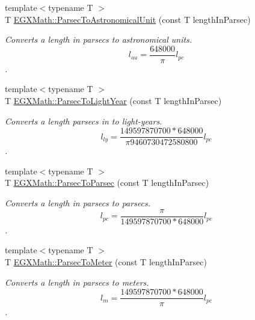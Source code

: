 \begin{DoxyCompactItemize}
\item 
{\footnotesize template$<$typename T $>$ }\\T \mbox{\hyperlink{group___e_g_x_math-_conversions-_length_conversions-_astronomical-_parsec-_astronomical_ga635dd871156c8bdd5e27198ba323380c}{E\+G\+X\+Math\+::\+Parsec\+To\+Astronomical\+Unit}} (const T length\+In\+Parsec)
\begin{DoxyCompactList}\small\item\em Converts a length in parsecs to astronomical units. \[ l_{au}= \frac{648000}{\pi} l_{pc} \]. \end{DoxyCompactList}\item 
{\footnotesize template$<$typename T $>$ }\\T \mbox{\hyperlink{group___e_g_x_math-_conversions-_length_conversions-_astronomical-_parsec-_astronomical_gaf6681b9c24d89c83c48bf6dabb9a433d}{E\+G\+X\+Math\+::\+Parsec\+To\+Light\+Year}} (const T length\+In\+Parsec)
\begin{DoxyCompactList}\small\item\em Converts a length parsecs in to light-\/years. \[ l_{ly}= \frac{149597870700 * 648000}{\pi 9460730472580800} l_{pc} \]. \end{DoxyCompactList}\item 
{\footnotesize template$<$typename T $>$ }\\T \mbox{\hyperlink{group___e_g_x_math-_conversions-_length_conversions-_astronomical-_parsec-_astronomical_gaf26b93b0097631545621d26c5a1366fc}{E\+G\+X\+Math\+::\+Parsec\+To\+Parsec}} (const T length\+In\+Parsec)
\begin{DoxyCompactList}\small\item\em Converts a length in parsecs to parsecs. \[ l_{pc}=\frac{\pi}{149597870700 * 648000} l_{pc} \]. \end{DoxyCompactList}\item 
{\footnotesize template$<$typename T $>$ }\\T \mbox{\hyperlink{group___e_g_x_math-_conversions-_length_conversions-_astronomical-_parsec-_s_i_gaa97ff0501ce04074bf9aacafc2135532}{E\+G\+X\+Math\+::\+Parsec\+To\+Meter}} (const T length\+In\+Parsec)
\begin{DoxyCompactList}\small\item\em Converts a length in parsecs to meters. \[ l_{m}=\frac{149597870700 * 648000}{\pi}l_{pc} \]. \end{DoxyCompactList}\item 

\end{DoxyCompactItemize}
